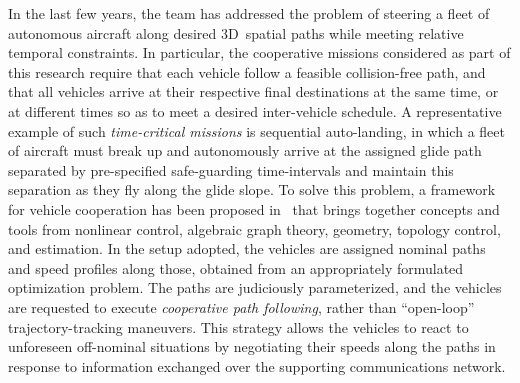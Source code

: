 \documentclass[letter,onecolumn,12pt]{aiaa-tc}
\newcommand{\1}{1_n}
\begin{document}
In the last few years, the team has addressed the problem of steering a fleet of autonomous aircraft along desired 3D~spatial paths while meeting relative temporal constraints. In particular, the cooperative missions considered as part of this research require that each vehicle follow a feasible collision-free path, and that all vehicles arrive at their respective final destinations at the same time, or at different times so as to meet a desired inter-vehicle schedule. A representative example of such \emph{time-critical missions} is sequential auto-landing, in which a fleet of aircraft must break up and autonomously arrive at the assigned glide path separated by pre-specified safe-guarding time-intervals and maintain this separation as they fly along the glide slope. To solve this problem, a framework for vehicle cooperation has been proposed in~\cite{JGCD13_CPF,XargayPhd} that brings together concepts and tools from nonlinear control, algebraic graph theory, geometry, topology control, and estimation. In the setup adopted, the vehicles are assigned nominal paths and speed profiles along those, obtained from an appropriately formulated optimization problem. The paths are judiciously parameterized, and the vehicles are requested to execute \emph{cooperative path following}, rather than ``open-loop'' trajectory-tracking maneuvers. This strategy allows the vehicles to react to unforeseen off-nominal situations by negotiating their speeds along the paths in response to information exchanged over the supporting communications network.
\end{document}
